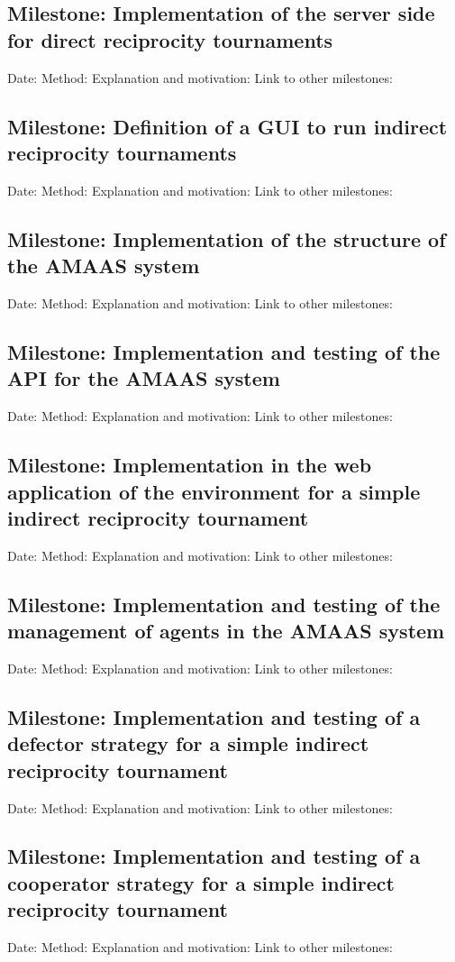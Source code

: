 \documentclass{article}
\begin{document}
\subsection*{Milestone: Implementation of the server side for direct reciprocity tournaments}
Date:
Method: 
Explanation and motivation:
Link to other milestones:

\subsection*{Milestone: Definition of a GUI to run indirect reciprocity tournaments}
Date:
Method: 
Explanation and motivation:
Link to other milestones:

\subsection*{Milestone: Implementation of the structure of the AMAAS system}
Date:
Method: 
Explanation and motivation:
Link to other milestones:

\subsection*{Milestone: Implementation and testing of the API for the AMAAS system}
Date:
Method: 
Explanation and motivation:
Link to other milestones:

\subsection*{Milestone: Implementation in the web application of the environment for a simple indirect reciprocity tournament}
Date:
Method: 
Explanation and motivation:
Link to other milestones:

\subsection*{Milestone: Implementation and testing of the management of agents in the AMAAS system}
Date:
Method: 
Explanation and motivation:
Link to other milestones:

\subsection*{Milestone: Implementation and testing of a defector strategy for a simple indirect reciprocity tournament}
Date:
Method: 
Explanation and motivation:
Link to other milestones:

\subsection*{Milestone: Implementation and testing of a cooperator strategy for a simple indirect reciprocity tournament}
Date:
Method: 
Explanation and motivation:
Link to other milestones:
\end{document}

